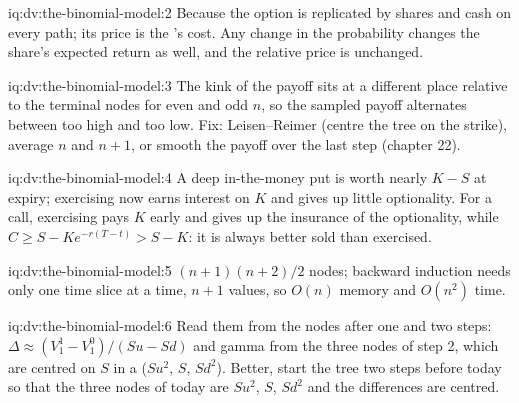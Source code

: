 \begin{solution}{iq:dv:the-binomial-model:2}
Because the option is replicated by shares and cash on every path; its price is
the 's cost. Any change in the probability changes the
share's expected return as well, and the relative price is unchanged.
\end{solution}

\begin{solution}{iq:dv:the-binomial-model:3}
The kink of the payoff sits at a different place relative to the terminal nodes
for even and odd $n$, so the sampled payoff alternates between too high and too
low. Fix: Leisen--Reimer (centre the tree on the strike), average $n$ and $n+1$,
or smooth the payoff over the last step (chapter 22).
\end{solution}

\begin{solution}{iq:dv:the-binomial-model:4}
A deep in-the-money put is worth nearly $K-S$ at expiry; exercising now earns
interest on $K$ and gives up little optionality. For a call, exercising pays $K$
early and gives up the insurance of the optionality, while $C\ge S-Ke^{-r(T-t)}>
S-K$: it is always better sold than exercised.
\end{solution}

\begin{solution}{iq:dv:the-binomial-model:5}
$(n+1)(n+2)/2$ nodes; backward induction needs only one time slice at a time,
$n+1$ values, so $O(n)$ memory and $O(n^2)$ time.
\end{solution}

\begin{solution}{iq:dv:the-binomial-model:6}
Read them from the nodes after one and two steps: $\Delta\approx(V_1^1-V_1^0)/
(Su-Sd)$ and gamma from the three nodes of step 2, which are centred on $S$ in a
 ($Su^2$, $S$, $Sd^2$). Better, start the tree two steps
before today so that the three nodes of today are $Su^2$, $S$, $Sd^2$ and the
differences are centred.
\end{solution}
